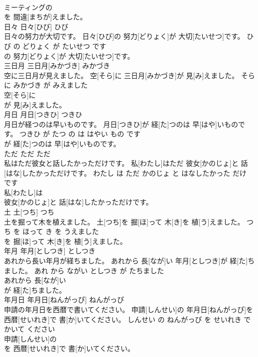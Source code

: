 \documentclass[8pt]{extreport}
\begin{document}
\begin{CJK}{UTF8}{min}
\\	ミーティングの
\\	を 間違[まちが]えました。			
\\	日々	日々[ひび]	ひび	
\\	日々の努力が大切です。	日々[ひび]の 努力[どりょく]が 大切[たいせつ]です。	ひび の どりょく が たいせつ です	
\\	の 努力[どりょく]が 大切[たいせつ]です。			
\\	三日月	三日月[みかづき]	みかづき	
\\	空に三日月が見えました。	空[そら]に 三日月[みかづき]が 見[み]えました。	そら に みかづき が みえました	
\\	空[そら]に
\\	が 見[み]えました。			
\\	月日	月日[つきひ]	つきひ	
\\	月日が経つのは早いものです。	月日[つきひ]が 経[た]つのは 早[はや]いものです。	つきひ が たつ の は はやい もの です	
\\	が 経[た]つのは 早[はや]いものです。			
\\	ただ	ただ	ただ	
\\	私はただ彼女と話したかっただけです。	私[わたし]はただ 彼女[かのじょ]と 話[はな]したかっただけです。	わたし は ただ かのじょ と はなしたかった だけ です	
\\	私[わたし]は
\\	彼女[かのじょ]と 話[はな]したかっただけです。			
\\	土	土[つち]	つち	
\\	土を掘って木を植えました。	土[つち]を 掘[ほ]って 木[き]を 植[う]えました。	つち を ほって き を うえました	
\\	を 掘[ほ]って 木[き]を 植[う]えました。			
\\	年月	年月[としつき]	としつき	
\\	あれから長い年月が経ちました。	あれから 長[なが]い 年月[としつき]が 経[た]ちました。	あれ から ながい としつき が たちました	
\\	あれから 長[なが]い
\\	が 経[た]ちました。			
\\	年月日	年月日[ねんがっぴ]	ねんがっぴ	
\\	申請の年月日を西暦で書いてください。	申請[しんせい]の 年月日[ねんがっぴ]を 西暦[せいれき]で 書[か]いてください。	しんせい の ねんがっぴ を せいれき で かいて ください	
\\	申請[しんせい]の
\\	を 西暦[せいれき]で 書[か]いてください。			

\end{CJK}
\end{document}
